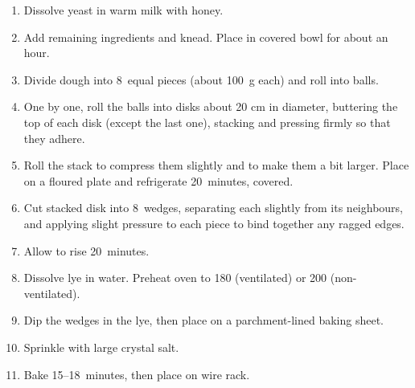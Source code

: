
\begin{ingredients}
\end{ingredients}


\begin{recipe}
  \begin{enumerate}

  \item Dissolve yeast in warm milk with honey.

  \item Add remaining ingredients and knead.  Place in covered bowl
    for about an hour.

  \item Divide dough into 8~equal pieces (about 100~g each) and roll
    into balls.

  \item One by one, roll the balls into disks about 20 cm in diameter,
    buttering the top of each disk (except the last one), stacking and
    pressing firmly so that they adhere.

  \item Roll the stack to compress them slightly and to make them a
    bit larger.  Place on a floured plate and refrigerate 20~minutes,
    covered.

  \item Cut stacked disk into 8~wedges, separating each slightly from
    its neighbours, and applying slight pressure to each piece to bind
    together any ragged edges.

  \item Allow to rise 20~minutes.

  \item Dissolve lye in water.  Preheat oven to 180\degreeC{}
    (ventilated) or 200\degreeC{} (non-ventilated).

  \item Dip the wedges in the lye, then place on a parchment-lined
    baking sheet.

  \item Sprinkle with large crystal salt.

  \item Bake 15--18~minutes, then place on wire rack.

  \end{enumerate}
\end{recipe}

